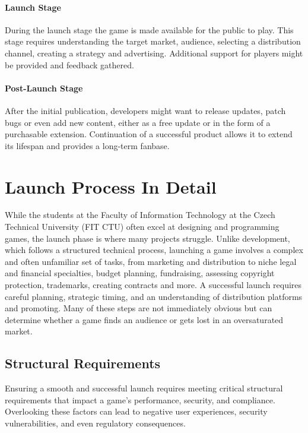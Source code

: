 \paragraph{Launch Stage}
During the launch stage the game is made available for the public to play. This stage requires understanding the target market, audience, selecting a distribution channel, creating a strategy and advertising. Additional support for players might be provided and feedback gathered.
\cite{bramble_7-stages, rocket_6-stages, esler_viable-games}

\paragraph{Post-Launch Stage}
After the initial publication, developers might want to release updates, patch bugs or even add new content, either as a free update or in the form of a purchasable extension. Continuation of a successful product allows it to extend its lifespan and provides a long-term fanbase.
\cite{bramble_7-stages, rocket_6-stages}

\section{Launch Process In Detail}
While the students at the Faculty of Information Technology at the Czech Technical University (FIT CTU) often excel at designing and programming games, the launch phase is where many projects struggle. Unlike development, which follows a structured technical process, launching a game involves a complex and often unfamiliar set of tasks, from marketing and distribution to niche legal and financial specialties, budget planning, fundraising, assessing copyright protection, trademarks, creating contracts and more. A successful launch requires careful planning, strategic timing, and an understanding of distribution platforms and promoting. Many of these steps are not immediately obvious but can determine whether a game finds an audience or gets lost in an oversaturated market.

\subsection{Structural Requirements}
Ensuring a smooth and successful launch requires meeting critical structural requirements that impact a game’s performance, security, and compliance. Overlooking these factors can lead to negative user experiences, security vulnerabilities, and even regulatory consequences.

